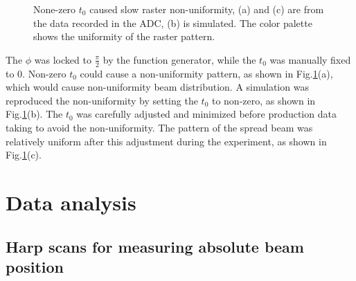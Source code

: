 \documentclass[english,review,number,sort&compress]{elsarticle}
\begin{document}
\begin{figure}[tbph]
\begin{centering}
{}
\par\end{centering}

\protect\caption{\label{fig:Slow-raster-uniformity}None-zero $t_{0}$ caused slow raster non-uniformity, (a) and (c) are from the data recorded in the ADC, (b) is simulated. The color palette shows the uniformity of the raster pattern.}
\end{figure}


The $\phi$ was locked to $\frac{\pi}{2}$ by the function generator, while the $t_{0}$ was manually fixed to 0. Non-zero $t_{0}$ could cause a non-uniformity pattern, as shown in Fig.\ref{fig:Slow-raster-uniformity}(a), which would cause non-uniformity beam distribution. A simulation was reproduced the non-uniformity by setting the $t_{0}$ to non-zero, as shown in Fig.\ref{fig:Slow-raster-uniformity}(b). The $t_{0}$ was carefully adjusted and minimized before production data taking to avoid the non-uniformity. The pattern of the spread beam was relatively uniform after this adjustment during the experiment, as shown in Fig.\ref{fig:Slow-raster-uniformity}(c).


\section{Data analysis}


\subsection{Harp scans for measuring absolute beam position}
\end{document}
